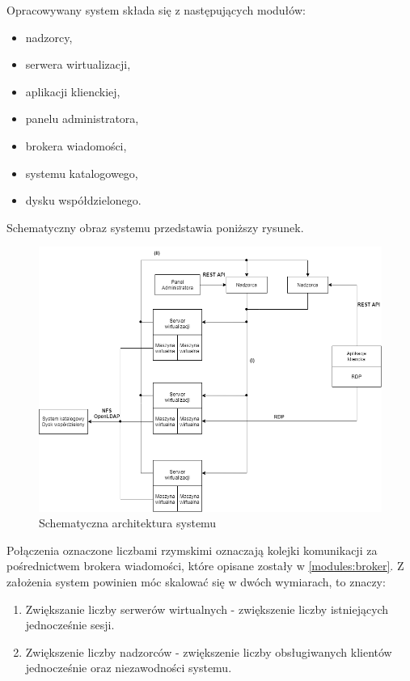 \documentclass[../opis-rozwiazania.tex]{subfiles}
\begin{document}
Opracowywany system składa się z następujących modułów:

\begin{itemize}
    \item nadzorcy,
    \item serwera wirtualizacji,
    \item aplikacji klienckiej,
    \item panelu administratora,
    \item brokera wiadomości,
    \item systemu katalogowego,
    \item dysku współdzielonego.
\end{itemize}

Schematyczny obraz systemu przedstawia poniższy rysunek.

\begin{figure}[H]
    \centering
    \includegraphics[width=\textwidth]{../diagrams/architecture.png}
    \caption{Schematyczna architektura systemu}
\end{figure}

Połączenia oznaczone liczbami rzymskimi oznaczają kolejki komunikacji za pośrednictwem brokera wiadomości, które opisane zostały w \ref{modules:broker}. Z założenia system powinien móc skalować się w dwóch wymiarach, to znaczy:
\begin{enumerate}
    \item Zwiększanie liczby serwerów wirtualnych - zwiększenie liczby istniejących jednocześnie sesji.
    \item Zwiększenie liczby nadzorców - zwiększenie liczby obsługiwanych klientów jednocześnie oraz niezawodności systemu.
\end{enumerate}
\end{document}
